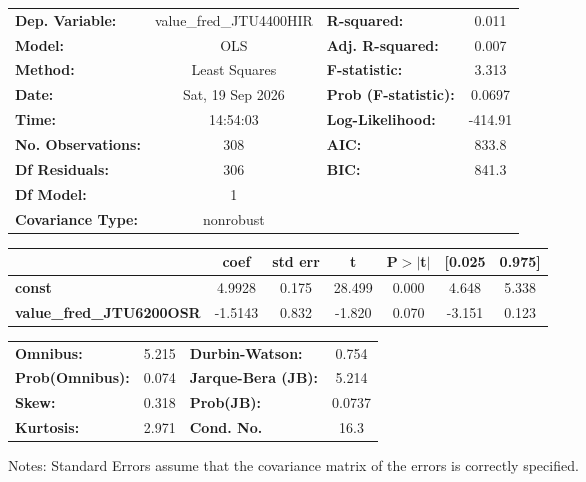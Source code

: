 \begin{center}
\begin{tabular}{lclc}
\toprule
\textbf{Dep. Variable:}          & value\_fred\_JTU4400HIR & \textbf{  R-squared:         } &     0.011   \\
\textbf{Model:}                  &           OLS           & \textbf{  Adj. R-squared:    } &     0.007   \\
\textbf{Method:}                 &      Least Squares      & \textbf{  F-statistic:       } &     3.313   \\
\textbf{Date:}                   &     Sat, 19 Sep 2026    & \textbf{  Prob (F-statistic):} &   0.0697    \\
\textbf{Time:}                   &         14:54:03        & \textbf{  Log-Likelihood:    } &   -414.91   \\
\textbf{No. Observations:}       &             308         & \textbf{  AIC:               } &     833.8   \\
\textbf{Df Residuals:}           &             306         & \textbf{  BIC:               } &     841.3   \\
\textbf{Df Model:}               &               1         & \textbf{                     } &             \\
\textbf{Covariance Type:}        &        nonrobust        & \textbf{                     } &             \\
\bottomrule
\end{tabular}
\begin{tabular}{lcccccc}
                                 & \textbf{coef} & \textbf{std err} & \textbf{t} & \textbf{P$> |$t$|$} & \textbf{[0.025} & \textbf{0.975]}  \\
\midrule
\textbf{const}                   &       4.9928  &        0.175     &    28.499  &         0.000        &        4.648    &        5.338     \\
\textbf{value\_fred\_JTU6200OSR} &      -1.5143  &        0.832     &    -1.820  &         0.070        &       -3.151    &        0.123     \\
\bottomrule
\end{tabular}
\begin{tabular}{lclc}
\textbf{Omnibus:}       &  5.215 & \textbf{  Durbin-Watson:     } &    0.754  \\
\textbf{Prob(Omnibus):} &  0.074 & \textbf{  Jarque-Bera (JB):  } &    5.214  \\
\textbf{Skew:}          &  0.318 & \textbf{  Prob(JB):          } &   0.0737  \\
\textbf{Kurtosis:}      &  2.971 & \textbf{  Cond. No.          } &     16.3  \\
\bottomrule
\end{tabular}
\end{center}

Notes: \newline
 [1] Standard Errors assume that the covariance matrix of the errors is correctly specified.